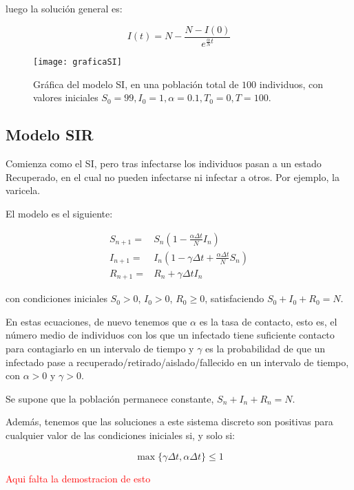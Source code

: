 luego la solución general es:

$$I(t) = N-\frac{N-I(0)}{e^{\frac{\alpha}{N}t}}$$


\begin{figure}
\begin{center}
\caption{Gráfica del modelo SI, en una población total de $100$ individuos, con valores iniciales $S_0=99, I_0 = 1, \alpha = 0.1, T_0 = 0, T = 100$.}
\texttt{[image: graficaSI]}
\end{center}
\end{figure}

\subsection{Modelo SIR}
Comienza como el SI, pero tras infectarse los individuos pasan a un estado Recuperado, en el cual no pueden infectarse ni infectar a otros.
Por ejemplo, la varicela. 

El modelo es el siguiente:

\begin{equation}
\label{eqn: SIR_modelo}
\begin{aligned}
S_{n+1} = & S_n \left(1-\frac{\alpha\Delta t}{N} I_n \right) \\
I_{n+1} = & I_n \left( 1-\gamma \Delta t + \frac{\alpha\Delta t}{N} S_n \right) \\
R_{n+1} = & R_n + \gamma \Delta t I_n
\end{aligned}
\end{equation}

con condiciones iniciales $S_0>0$, $I_0>0$, $R_0\geq 0$, satisfaciendo $S_0+I_0+R_0=N$.

En estas ecuaciones, de nuevo tenemos que $\alpha$ es la tasa de contacto, esto es, el número medio de individuos con los que un infectado tiene suficiente contacto para contagiarlo en un intervalo de tiempo y $\gamma$ es la probabilidad de que un infectado pase a recuperado/retirado/aislado/fallecido en un intervalo de tiempo, con $\alpha >0$ y $\gamma >0$.

Se supone que la población permanece constante, $S_n+I_n+R_n=N$.

Además, tenemos que las soluciones a este sistema discreto son positivas para cualquier valor de las condiciones iniciales si, y solo si:

$$\max{\big\{\gamma\Delta t, \alpha\Delta t\big\} } \leq 1$$

\textcolor{red}{Aqui falta la demostracion de esto}

